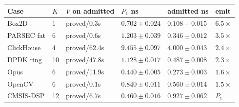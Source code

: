 \begin{center}
\scriptsize
\begin{tabular}{llllll}
\toprule
Case & $K$ & $V$ on admitted & $P_1$ ns & admitted ns & emit \\
\midrule
Box2D & 1 & proved/0.3s & $0.702 \pm 0.024$ & $0.108 \pm 0.015$ & $6.5\times$ \\
PARSEC fat & 6 & proved/0.6s & $1.203 \pm 0.039$ & $0.346 \pm 0.012$ & $3.5\times$ \\
ClickHouse & 4 & proved/62.4s & $9.455 \pm 0.097$ & $4.000 \pm 0.043$ & $2.4\times$ \\
DPDK ring & 10 & proved/47.8s & $1.128 \pm 0.017$ & $0.487 \pm 0.008$ & $2.3\times$ \\
Opus & 6 & proved/11.9s & $0.440 \pm 0.005$ & $0.273 \pm 0.003$ & $1.6\times$ \\
OpenCV & 6 & proved/0.1s & $0.840 \pm 0.011$ & $0.560 \pm 0.014$ & $1.5\times$ \\
CMSIS-DSP & 12 & proved/6.7s & $0.460 \pm 0.016$ & $0.927 \pm 0.062$ & $P_1$ \\
\bottomrule
\end{tabular}
\end{center}
